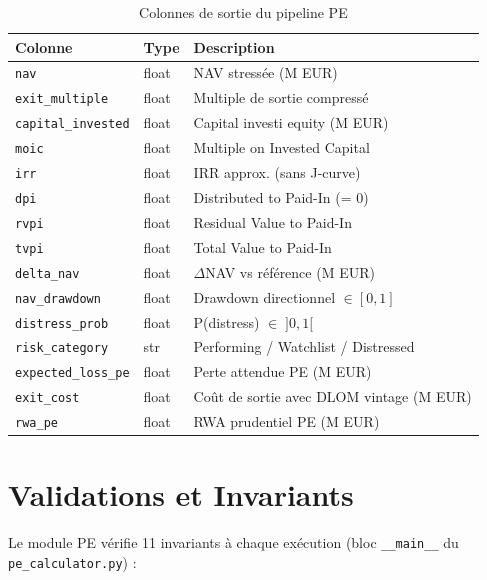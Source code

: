 \documentclass[12pt,a4paper]{article}
\begin{document}
\begin{table}[h]
\centering
\caption{Colonnes de sortie du pipeline PE}
\label{tab:output_cols}
\begin{tabular}{lll}
\toprule
\textbf{Colonne} & \textbf{Type} & \textbf{Description} \\
\midrule
\texttt{nav}             & float & NAV stress\'{e}e (M EUR) \\
\texttt{exit\_multiple}  & float & Multiple de sortie compress\'{e} \\
\texttt{capital\_invested} & float & Capital investi equity (M EUR) \\
\texttt{moic}            & float & Multiple on Invested Capital \\
\texttt{irr}             & float & IRR approx. (sans J-curve) \\
\texttt{dpi}             & float & Distributed to Paid-In (= 0) \\
\texttt{rvpi}            & float & Residual Value to Paid-In \\
\texttt{tvpi}            & float & Total Value to Paid-In \\
\texttt{delta\_nav}      & float & $\Delta$NAV vs r\'{e}f\'{e}rence (M EUR) \\
\texttt{nav\_drawdown}   & float & Drawdown directionnel $\in [0, 1]$ \\
\texttt{distress\_prob}  & float & P(distress) $\in\; ]0, 1[$ \\
\texttt{risk\_category}  & str   & Performing / Watchlist / Distressed \\
\texttt{expected\_loss\_pe} & float & Perte attendue PE (M EUR) \\
\texttt{exit\_cost}      & float & Co\^{u}t de sortie avec DLOM vintage (M EUR) \\
\texttt{rwa\_pe}         & float & RWA prudentiel PE (M EUR) \\
\bottomrule
\end{tabular}
\end{table}


\section{Validations et Invariants}
\label{sec:validations}

Le module PE v\'{e}rifie 11 invariants \`{a} chaque ex\'{e}cution (bloc \texttt{\_\_main\_\_}
du \texttt{pe\_calculator.py}) :
\end{document}
